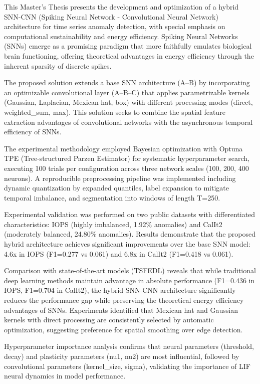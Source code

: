 This Master's Thesis presents the development and optimization of a hybrid SNN-CNN (Spiking Neural Network - Convolutional Neural Network) architecture for time series anomaly detection, with special emphasis on computational sustainability and energy efficiency. Spiking Neural Networks (SNNs) emerge as a promising paradigm that more faithfully emulates biological brain functioning, offering theoretical advantages in energy efficiency through the inherent sparsity of discrete spikes.

The proposed solution extends a base SNN architecture (A--B) by incorporating an optimizable convolutional layer (A--B--C) that applies parametrizable kernels (Gaussian, Laplacian, Mexican hat, box) with different processing modes (direct, weighted\_sum, max). This solution seeks to combine the spatial feature extraction advantages of convolutional networks with the asynchronous temporal efficiency of SNNs.

The experimental methodology employed Bayesian optimization with Optuna TPE (Tree-structured Parzen Estimator) for systematic hyperparameter search, executing 100 trials per configuration across three network scales (100, 200, 400 neurons). A reproducible preprocessing pipeline was implemented including dynamic quantization by expanded quantiles, label expansion to mitigate temporal imbalance, and segmentation into windows of length T=250.

Experimental validation was performed on two public datasets with differentiated characteristics: IOPS (highly imbalanced, 1.92\% anomalies) and CalIt2 (moderately balanced, 24.80\% anomalies). Results demonstrate that the proposed hybrid architecture achieves significant improvements over the base SNN model: 4.6x in IOPS (F1=0.277 vs 0.061) and 6.8x in CalIt2 (F1=0.418 vs 0.061).

Comparison with state-of-the-art models (TSFEDL) reveals that while traditional deep learning methods maintain advantage in absolute performance (F1=0.436 in IOPS, F1=0.704 in CalIt2), the hybrid SNN-CNN architecture significantly reduces the performance gap while preserving the theoretical energy efficiency advantages of SNNs. Experiments identified that Mexican hat and Gaussian kernels with direct processing are consistently selected by automatic optimization, suggesting preference for spatial smoothing over edge detection.

Hyperparameter importance analysis confirms that neural parameters (threshold, decay) and plasticity parameters (nu1, nu2) are most influential, followed by convolutional parameters (kernel\_size, sigma), validating the importance of LIF neural dynamics in model performance.

